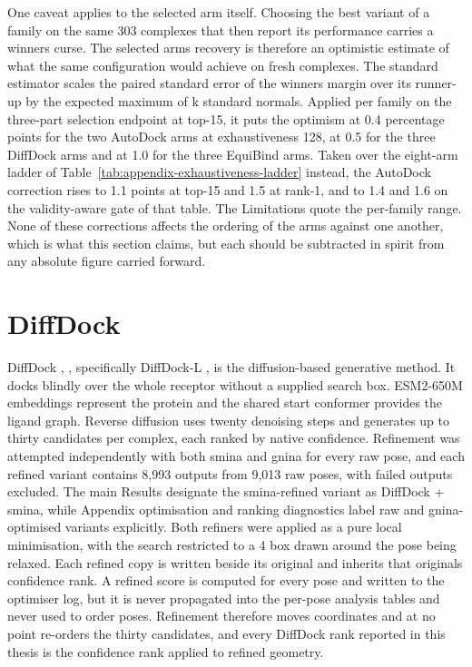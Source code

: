 One caveat applies to the selected arm itself. Choosing the best variant of a family on the same 303 complexes that then report its performance carries a winner\textquotesingle s curse. The selected arm\textquotesingle s recovery is therefore an optimistic estimate of what the same configuration would achieve on fresh complexes. The standard estimator scales the paired standard error of the winner\textquotesingle s margin over its runner-up by the expected maximum of k standard normals. Applied per family on the three-part selection endpoint at top-15, it puts the optimism at 0.4 percentage points for the two AutoDock arms at exhaustiveness 128, at 0.5 for the three DiffDock arms and at 1.0 for the three EquiBind arms. Taken over the eight-arm ladder of Table~\ref{tab:appendix-exhaustiveness-ladder} instead, the AutoDock correction rises to 1.1 points at top-15 and 1.5 at rank-1, and to 1.4 and 1.6 on the validity-aware gate of that table. The Limitations quote the per-family range. None of these corrections affects the ordering of the arms against one another, which is what this section claims, but each should be subtracted in spirit from any absolute figure carried forward.

\hypertarget{diffdock-2}{%
\section{DiffDock}\label{diffdock-2}}

DiffDock \cite{ref024}, \cite{ref008}, specifically DiffDock-L \cite{ref091}, is the diffusion-based generative method. It docks blindly over the whole receptor without a supplied search box. ESM2-650M embeddings represent the protein and the shared start conformer provides the ligand graph. Reverse diffusion uses twenty denoising steps and generates up to thirty candidates per complex, each ranked by native confidence. Refinement was attempted independently with both smina and gnina for every raw pose, and each refined variant contains 8,993 outputs from 9,013 raw poses, with failed outputs excluded. The main Results designate the smina-refined variant as DiffDock + smina, while Appendix optimisation and ranking diagnostics label raw and gnina-optimised variants explicitly. Both refiners were applied as a pure local minimisation, with the search restricted to a 4\angstrom{} box drawn around the pose being relaxed. Each refined copy is written beside its original and inherits that original\textquotesingle s confidence rank. A refined score is computed for every pose and written to the optimiser log, but it is never propagated into the per-pose analysis tables and never used to order poses. Refinement therefore moves coordinates and at no point re-orders the thirty candidates, and every DiffDock rank reported in this thesis is the confidence rank applied to refined geometry.

